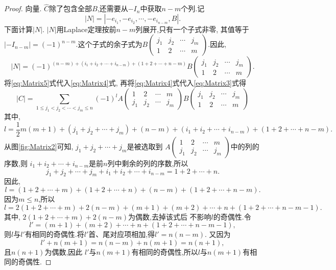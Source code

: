 \begin{proof}
  向量. $\hat C$除了包含全部$B$,还需要从$-I_n$中获取$n-m$个列.记
  \[
    |N|=|-e_{i_1},-e_{i_2},\cdots,-e_{i_{n-m}},B|.
  \]
 下面计算$|N|$. $|N|$用Laplace定理按前$n-m$列展开,只有一个子式非零,
  其值等于$|-I_{n-m}|=(-1)^{n-m}$.这个子式的余子式为$B\left(\begin{smallmatrix}
      j_1 & j_2 & \cdots & j_m\\
      1 & 2 & \cdots & m \end{smallmatrix}\right)$.因此,
  \begin{equation}\label{eq:Matrix5}
    |N| = (-1)^{(n-m)+(i_1+i_2+\cdots+i_{n-m})+(1+2+\cdots+n-m)}%
    B\left(\begin{smallmatrix}
      j_1 & j_2 & \cdots & j_m\\
      1 & 2 & \cdots & m \end{smallmatrix}\right).
  \end{equation}
  将\eqref{eq:Matrix5}式代入\eqref{eq:Matrix4}式,
  再将\eqref{eq:Matrix4}式代入\eqref{eq:Matrix3}式得
\begin{equation}\label{eq:Matrix6}
  |C|=\sum\limits_{1\le j_1<j_2<\cdots<j_m\le n}
  (-1)^{l}
  A\left(\begin{smallmatrix}
      1 & 2 & \cdots & m \\
      j_1 & j_2 & \cdots & j_m \end{smallmatrix}\right)
  B\left(\begin{smallmatrix}
      j_1 & j_2 & \cdots & j_m\\
      1 & 2 & \cdots & m \end{smallmatrix}\right)
\end{equation}
其中,
\[
  l=\frac{1}{2}m(m+1)+(j_1+j_2+\cdots+j_m)+(n-m)+(i_1+i_2+\cdots+i_{n-m})+
  (1+2+\cdots+n-m).
\]
从图\eqref{fig:Matrix2}可知, $j_1+j_2+\cdots+j_m$是被选取到
$A\left(\begin{smallmatrix}
      1 & 2 & \cdots & m \\
      j_1 & j_2 & \cdots & j_m \end{smallmatrix}\right)$中的列的序数,则
  $i_1+i_2+\cdots+i_{n-m}$是前$n$列中剩余的列的序数,所以
  \[
    j_1+j_2+\cdots+j_m+i_1+i_2+\cdots+i_{n-m}=1+2+\cdots+n.
  \]
  因此,
  \[
    l=(1+2+\cdots+m)+(1+2+\cdots+n)+(n-m)+(1+2+\cdots+n-m).
  \]
  因为$m \le n$,所以
  \[
    l=2(1+2+\cdots+m)+2(n-m)+(m+1)+(m+2)+\cdots+n+
    (1+2+\cdots+n-m-1).
  \]
  其中, $2(1+2+\cdots+m)+2(n-m)$为偶数,去掉该式后
  不影响$l$的奇偶性.令
  \[
    l'=(m+1)+(m+2)+\cdots+n+(1+2+\cdots+n-m-1),
  \]
  则$l$与$l'$有相同的奇偶性.将$l'$首、尾对应项相加,得$l'=n(n-m)$.
  又因为
  \[
    l'+n(m+1)=n(n-m)+n(m+1)=n(n+1),
  \]
  且$n(n+1)$为偶数,因此
  $l'$与$n(m+1)$有相同的奇偶性,所以$l$与$n(m+1)$有相同的奇偶性.


\end{proof}
